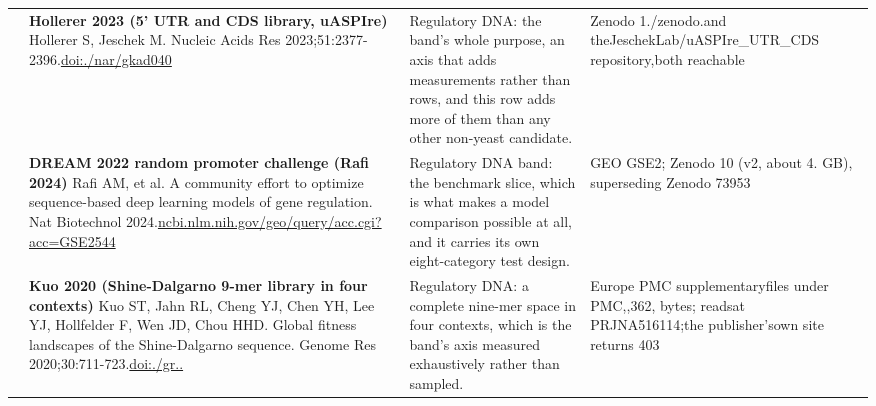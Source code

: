 \begin{landscape}
\begin{longtable}{@{}r@{\hspace{4pt}} L{78mm} L{72mm} L{76mm}@{}}
 & \textbf{Hollerer 2023 (5' UTR and CDS library, uASPIre)} \newline Hollerer S, Jeschek M. Nucleic Acids Res 2023;51:2377-2396.\newline \href{https://doi.org/10.1093/nar/gkad040}{doi:./\allowbreak nar/\allowbreak gkad040} & Regulatory DNA: the band's whole purpose, an axis that adds measurements rather than rows, and this row adds more of them than any other non-yeast candidate. & Zenodo 1./\allowbreak zenodo.\allowbreak  and the\allowbreak  Jeschek\allowbreak Lab/\allowbreak uASPIre\_\allowbreak UTR\_\allowbreak CDS rep\allowbreak ository,\allowbreak  both re\allowbreak achable \\
 & \textbf{DREAM 2022 random promoter challenge (Rafi 2024)} \newline Rafi AM, et al. A community effort to optimize sequence-based deep learning models of gene regulation. Nat Biotechnol 2024.\newline \href{https://www.ncbi.nlm.nih.gov/geo/query/acc.cgi?acc=GSE254493}{ncbi.\allowbreak nlm.\allowbreak nih.\allowbreak gov/\allowbreak geo/\allowbreak query/\allowbreak acc.\allowbreak cgi?\allowbreak acc=\allowbreak GSE2544} & Regulatory DNA band: the benchmark slice, which is what makes a model comparison possible at all, and it carries its own eight-category test design. & GEO GSE2; Z\allowbreak enodo 10 (\allowbreak v2, abou\allowbreak t 4. GB), \allowbreak supersed\allowbreak ing Zeno\allowbreak do 73953 \\
 & \textbf{Kuo 2020 (Shine-Dalgarno 9-mer library in four contexts)} \newline Kuo ST, Jahn RL, Cheng YJ, Chen YH, Lee YJ, Hollfelder F, Wen JD, Chou HHD. Global fitness landscapes of the Shine-Dalgarno sequence. Genome Res 2020;30:711-723.\newline \href{https://doi.org/10.1101/gr.260182.119}{doi:./\allowbreak gr..} & Regulatory DNA: a complete nine-mer space in four contexts, which is the band's axis measured exhaustively rather than sampled. & Europe P\allowbreak MC suppl\allowbreak ementary\allowbreak  files u\allowbreak nder PMC,,362, byte\allowbreak s; reads\allowbreak  at PRJN\allowbreak A516114;\allowbreak  the pub\allowbreak lisher's\allowbreak  own sit\allowbreak e return\allowbreak s 403 \\

\end{longtable}
\end{landscape}

